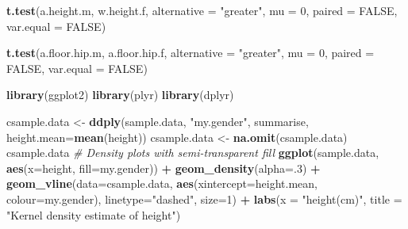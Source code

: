 \documentclass[]{article}
\newenvironment{Shaded}{\begin{snugshade}}{\end{snugshade}}
\newcommand{\CommentTok}[1]{\textcolor[rgb]{0.56,0.35,0.01}{\textit{#1}}}
\newcommand{\DataTypeTok}[1]{\textcolor[rgb]{0.13,0.29,0.53}{#1}}
\newcommand{\DecValTok}[1]{\textcolor[rgb]{0.00,0.00,0.81}{#1}}
\newcommand{\KeywordTok}[1]{\textcolor[rgb]{0.13,0.29,0.53}{\textbf{#1}}}
\newcommand{\NormalTok}[1]{#1}
\newcommand{\OperatorTok}[1]{\textcolor[rgb]{0.81,0.36,0.00}{\textbf{#1}}}
\newcommand{\OtherTok}[1]{\textcolor[rgb]{0.56,0.35,0.01}{#1}}
\newcommand{\StringTok}[1]{\textcolor[rgb]{0.31,0.60,0.02}{#1}}
\begin{document}
\begin{Shaded}
\begin{Highlighting}[]
\KeywordTok{t.test}\NormalTok{(a.height.m, w.height.f,}
       \DataTypeTok{alternative =} \StringTok{"greater"}\NormalTok{,}
       \DataTypeTok{mu =} \DecValTok{0}\NormalTok{, }\DataTypeTok{paired =} \OtherTok{FALSE}\NormalTok{, }\DataTypeTok{var.equal =} \OtherTok{FALSE}\NormalTok{)}
\end{Highlighting}
\end{Shaded}

\begin{Shaded}
\begin{Highlighting}[]
\KeywordTok{t.test}\NormalTok{(a.floor.hip.m, a.floor.hip.f,}
       \DataTypeTok{alternative =} \StringTok{"greater"}\NormalTok{,}
       \DataTypeTok{mu =} \DecValTok{0}\NormalTok{, }\DataTypeTok{paired =} \OtherTok{FALSE}\NormalTok{, }\DataTypeTok{var.equal =} \OtherTok{FALSE}\NormalTok{)}
\end{Highlighting}
\end{Shaded}

\begin{Shaded}
\begin{Highlighting}[]
\KeywordTok{library}\NormalTok{(ggplot2)}
\KeywordTok{library}\NormalTok{(plyr)}
\KeywordTok{library}\NormalTok{(dplyr)}

\NormalTok{csample.data \textless{}{-}}\StringTok{ }\KeywordTok{ddply}\NormalTok{(sample.data, }\StringTok{"my.gender"}\NormalTok{, summarise, }\DataTypeTok{height.mean=}\KeywordTok{mean}\NormalTok{(height))}
\NormalTok{csample.data \textless{}{-}}\StringTok{ }\KeywordTok{na.omit}\NormalTok{(csample.data)}
\NormalTok{csample.data}
\CommentTok{\# Density plots with semi{-}transparent fill}
\KeywordTok{ggplot}\NormalTok{(sample.data, }\KeywordTok{aes}\NormalTok{(}\DataTypeTok{x=}\NormalTok{height, }\DataTypeTok{fill=}\NormalTok{my.gender)) }\OperatorTok{+}\StringTok{ }\KeywordTok{geom\_density}\NormalTok{(}\DataTypeTok{alpha=}\NormalTok{.}\DecValTok{3}\NormalTok{) }\OperatorTok{+}
\StringTok{        }\KeywordTok{geom\_vline}\NormalTok{(}\DataTypeTok{data=}\NormalTok{csample.data, }\KeywordTok{aes}\NormalTok{(}\DataTypeTok{xintercept=}\NormalTok{height.mean,  }\DataTypeTok{colour=}\NormalTok{my.gender), }\DataTypeTok{linetype=}\StringTok{"dashed"}\NormalTok{, }\DataTypeTok{size=}\DecValTok{1}\NormalTok{) }\OperatorTok{+}
\StringTok{        }\KeywordTok{labs}\NormalTok{(}\DataTypeTok{x =} \StringTok{"height(cm)"}\NormalTok{,}
             \DataTypeTok{title =} \StringTok{"Kernel density estimate of height"}\NormalTok{)}
\end{Highlighting}
\end{Shaded}
\end{document}
